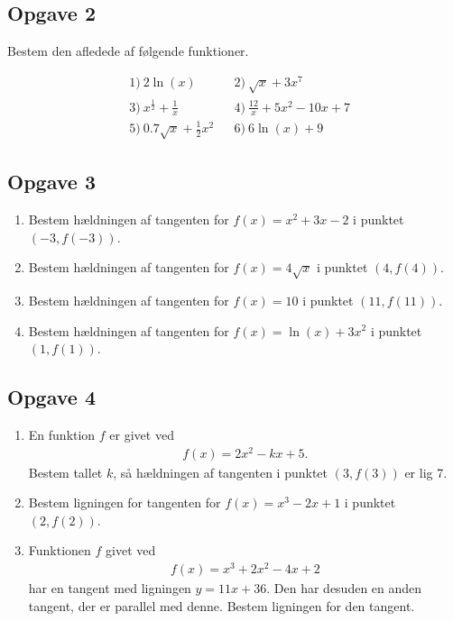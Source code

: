 \documentclass[12pt]{article}
\begin{document}
\subsection*{Opgave 2}
Bestem den afledede af følgende funktioner.

\begin{align*}
	&1) \ 2\ln(x)  &&2) \ \sqrt{x}+ 3x^7     \\
	&3) \ x^\frac{1}{2} + \frac{1}{x} &&4) \  \frac{12}{x}+5x^2-10x+7    \\ 
	&5) \ 0.7\sqrt{x}+\frac{1}{2}x^2  &&6) \  6\ln(x)+9    
\end{align*}

\subsection*{Opgave 3}
\begin{enumerate}[label=\roman*)]
	\item Bestem hældningen af tangenten for $f(x) = x^2+3x-2$ i punktet $(-3,f(-3))$. 
	\item Bestem hældningen af tangenten for $f(x) = 4\sqrt{x}$ i punktet $(4,f(4))$.
	\item Bestem hældningen af tangenten for $f(x) = 10$ i punktet $(11,f(11))$.
	\item Bestem hældningen af tangenten for $f(x) = \ln(x) + 3x^2$ i punktet $(1,f(1))$. 
\end{enumerate}

\subsection*{Opgave 4}

\begin{enumerate}[label=\roman*)]
	\item En funktion $f$ er givet ved
	\begin{align*}
		f(x)=2x^2-kx+ 5.
	\end{align*}
	Bestem tallet $k$, så hældningen af tangenten i punktet $(3,f(3))$ er lig 7.
	\item Bestem ligningen for tangenten for $f(x) = x^3 - 2x + 1$ i punktet $(2,f(2))$.
	\item Funktionen $f$ givet ved
	\begin{align*}
		f(x) = x^3+2x^2-4x+2 
	\end{align*}
	har en tangent med ligningen $y = 11x + 36$. Den har desuden en anden tangent, der er parallel med denne. 
	Bestem ligningen for den tangent. 
\end{enumerate}
\end{document}
